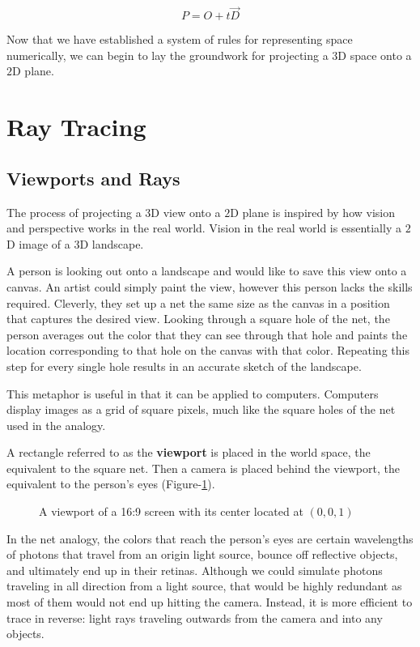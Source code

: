 \documentclass[a4paper]{article}
\begin{document}
\begin{equation}\label{equation:3dvect}
    P = O + t\vec{D}
\end{equation}

Now that we have established a system of rules for representing space numerically, we can begin to lay the groundwork for projecting a $3$D space onto a $2$D plane.

\newpage
\section{Ray Tracing}
\subsection{Viewports and Rays}
The process of projecting a $3$D view onto a $2$D plane is inspired by how vision and perspective works in the real world. Vision in the real world is essentially a $2$D image of a $3$D landscape.

A person is looking out onto a landscape and would like to save this view onto a canvas. An artist could simply paint the view, however this person lacks the skills required. Cleverly, they set up a net the same size as the canvas in a position that captures the desired view. Looking through a square hole of the net, the person averages out the color that they can see through that hole and paints the location corresponding to that hole on the canvas with that color. Repeating this step for every single hole results in an accurate sketch of the landscape.\autocite{Gambetta2021}

This metaphor is useful in that it can be applied to computers. Computers display images as a grid of square pixels, much like the square holes of the net used in the analogy.

A rectangle referred to as the \textbf{viewport} is placed in the world space, the equivalent to the square net. Then a camera is placed behind the viewport, the equivalent to the person's eyes (Figure-\ref{figure:viewport}).

\begin{figure}[htp]
    \centering
    
    \caption{A viewport of a 16:9 screen with its center located at $(0, 0, 1)$}\label{figure:viewport}
\end{figure}

In the net analogy, the colors that reach the person's eyes are certain wavelengths of photons that travel from an origin light source, bounce off reflective objects, and ultimately end up in their retinas. Although we could simulate photons traveling in all direction from a light source, that would be highly redundant as most of them would not end up hitting the camera. Instead, it is more efficient to trace in reverse: light rays traveling outwards from the camera and into any objects.
\end{document}
